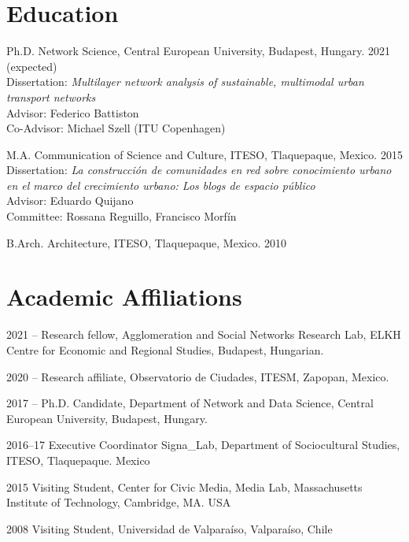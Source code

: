 \documentclass{academiccv}
\begin{document}
\section*{Education}
\begin{tablist}
	\item[Ph.D. ] \tab Network Science, Central European University, Budapest, Hungary. 2021 (expected) \\
                  Dissertation: \textit{Multilayer network analysis of sustainable, multimodal urban transport networks} \\
                  Advisor: Federico Battiston \\
                  Co-Advisor: Michael Szell (ITU Copenhagen)
	\item[M.A.]  \tab Communication of Science and Culture, ITESO, Tlaquepaque, Mexico. 2015 \\
					Dissertation: \textit{La construcción de comunidades en red sobre conocimiento urbano en el marco del crecimiento urbano: Los blogs de espacio público}\\
					Advisor: Eduardo Quijano \\
					Committee: Rossana Reguillo, Francisco Morfín
	\item[B.Arch.]  \tab Architecture,  ITESO, Tlaquepaque, Mexico. 2010
\end{tablist}


\section*{Academic Affiliations}
\begin{tablist}
	\item [2021 -- ] \tab Research fellow, Agglomeration and Social Networks Research Lab, ELKH Centre for Economic and Regional Studies, Budapest, Hungarian.
	\item [2020 -- ] \tab Research affiliate, Observatorio de Ciudades, ITESM, Zapopan, Mexico.
	\item [2017 -- ] \tab Ph.D. Candidate, Department of Network and Data Science, Central European University, Budapest, Hungary.
	\item[2016--17] \tab Executive Coordinator Signa\_Lab, Department of Sociocultural Studies, ITESO, Tlaquepaque. Mexico
	\item[2015] \tab Visiting Student, Center for Civic Media,  Media Lab, Massachusetts Institute of Technology, Cambridge, MA. USA
	\item[2008] \tab Visiting Student, Universidad de Valparaíso, Valparaíso, Chile  
\end{tablist}
\end{document}
